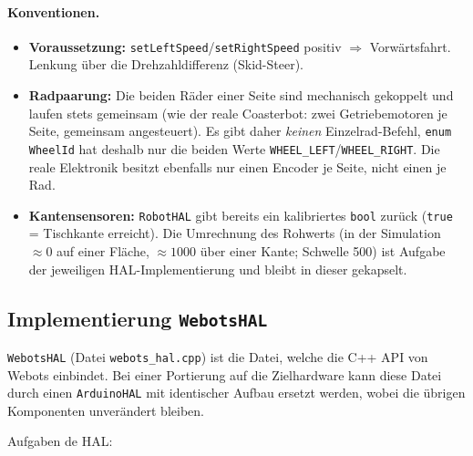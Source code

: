 \documentclass[
  a4paper,
  12pt,
  DIV=12,        %
  parskip=half,  %
  headings=small %
]{scrartcl}
\theoremstyle{definition}
\providecommand{\tightlist}{%
  \setlength{\itemsep}{0pt}\setlength{\parskip}{0pt}}
\theoremstyle{definition}
\begin{document}
\paragraph{Konventionen.}
\begin{itemize}
\tightlist
\item
  \textbf{Voraussetzung:} \texttt{setLeftSpeed}/\texttt{setRightSpeed}
  positiv $\Rightarrow$ Vorwärtsfahrt. Lenkung über die Drehzahl\-differenz
  (Skid-Steer).
\item
  \textbf{Radpaarung:} Die beiden Räder einer Seite sind mechanisch
  gekoppelt und laufen stets gemeinsam (wie der reale Coasterbot: zwei
  Getriebemotoren je Seite, gemeinsam angesteuert). Es gibt daher
  \emph{keinen} Einzelrad-Befehl, \texttt{enum WheelId} hat deshalb
  nur die beiden Werte \texttt{WHEEL\_LEFT}/\texttt{WHEEL\_RIGHT}.
  Die reale Elektronik besitzt ebenfalls nur einen Encoder je Seite, nicht
  einen je Rad.
\item
  \textbf{Kantensensoren:} \texttt{RobotHAL} gibt bereits ein kalibriertes
  \texttt{bool} zurück (\texttt{true} = Tischkante erreicht). Die Umrechnung des
  Rohwerts (in der Simulation $\approx 0$ auf einer Fläche, $\approx 1000$
  über einer Kante; Schwelle \num{500}) ist Aufgabe der jeweiligen
  HAL-Implementierung und bleibt in dieser gekapselt.
\end{itemize}

\subsection{Implementierung \texttt{WebotsHAL}}\label{webotshal}

\texttt{WebotsHAL} (Datei \texttt{webots\_hal.cpp}) ist die
Datei, welche die C++ API von Webots einbindet. Bei einer Portierung auf die
Zielhardware kann diese Datei durch einen \texttt{ArduinoHAL} mit
identischer Aufbau ersetzt werden, wobei die übrigen Komponenten
unverändert bleiben.

Aufgaben de HAL:
\end{document}
